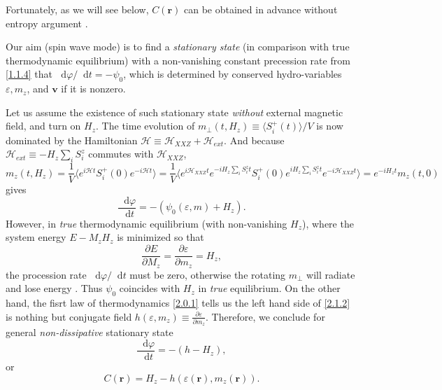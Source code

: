 \documentclass[10pt,nofootinbib]{revtex4}
\newcommand*\dd{\mathop{}\!\mathrm{d}}
\begin{document}
			Fortunately, as we will see below, $C(\bm{r})$ can be obtained in advance without entropy argument \cite{chaikin2000principles,halperin1969hydrodynamic}.\par
			Our aim (spin wave mode) is to find a \emph{stationary state} (in comparison with true thermodynamic equilibrium) with a non-vanishing constant precession rate from \eqref{1.1.4} that $\dd\varphi/\dd t=-\psi_0$, which is determined by conserved hydro-variables $\varepsilon,m_z$, and $\bm{v}$ if it is nonzero.\par
			Let us assume the existence of such stationary state \emph{without} external magnetic field, and turn on $H_z$. The time evolution of $m_\perp(t,H_z)\equiv\langle S_i^+(t)\rangle/V$ is now dominated by the Hamiltonian $\mathcal{H}\equiv\mathcal{H}_{XXZ}+\mathcal{H}_{ext}$. And because $\mathcal{H}_{ext}\equiv-H_z\sum_i S_i^z$ commutes with $\mathcal{H}_{XXZ}$,
			\begin{equation*}
				m_z(t,H_z)=\dfrac{1}{V}\bigg\langle e^{i\mathcal{H}t}S_i^+(0)e^{-i\mathcal{H}t}\bigg\rangle=\dfrac{1}{V}\bigg\langle e^{i\mathcal{H}_{XXZ}t}e^{-iH_z\sum_iS_i^zt}S_i^+(0)e^{iH_z\sum_iS_i^zt}e^{-i\mathcal{H}_{XXZ}t}\bigg\rangle=e^{-iH_zt}m_z(t,0)
			\end{equation*}
			gives
			\begin{equation*}
				\dfrac{\dd\varphi}{\dd t}=-(\psi_0(\varepsilon,m)+H_z).
			\end{equation*}
			However, in \emph{true} thermodynamic equilibrium (with non-vanishing $H_z$), where the system energy $E-M_z H_z$ is minimized so that
			\begin{equation}\label{2.1.2}
				\dfrac{\partial E}{\partial M_z}=\dfrac{\partial \varepsilon}{\partial m_z}=H_z,
			\end{equation}
			the procession rate $\dd\varphi/\dd t$ must be zero, otherwise the rotating $m_\perp$ will radiate and lose energy \cite{halperin1969hydrodynamic}. Thus $\psi_0$ coincides with $H_z$ in \emph{true} equilibrium. On the other hand, the fisrt law of thermodynamics \eqref{2.0.1} tells us the left hand side of \eqref{2.1.2} is nothing but conjugate field $h(\varepsilon,m_z)\equiv\frac{\partial \varepsilon}{\partial m_z}$. Therefore, we conclude for general \emph{non-dissipative} stationary state 
			\begin{equation}\label{2.1.3}
				\dfrac{\dd\varphi}{\dd t}=-(h-H_z),
			\end{equation}
			or
			\begin{equation}\label{2.1.4}
				C(\bm{r})=H_z-h(\varepsilon(\bm{r}),m_z(\bm{r})).
			\end{equation}
\end{document}
